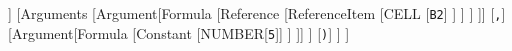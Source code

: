 	\begin{forest}
			[Formula
				[FunctionCall
					[EXCEL-FUNCTION[{\texttt{SUM(}}]]
					[Arguments
						[Argument[Formula
							[Reference
								[ReferenceItem
									[CELL
										[\texttt{B2}]
									]
								]
							]
						]]
						[\texttt{,}]
						[Argument[Formula
							[Constant
								[NUMBER[\texttt{5}]]
							]
						]]
					]
					[{\texttt{)}}]
				]
			]
	\end{forest}